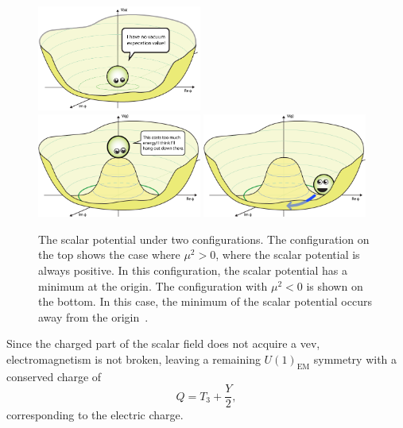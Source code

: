 \begin{figure}[ht]
  \centering
  \includegraphics[width=0.48\textwidth]
      {figs/theory/BoringPotential.png}
  \\
  \includegraphics[width=0.48\textwidth]
  {figs/theory/Higgs-Potential-lookdown.png}
  \includegraphics[width=0.48\textwidth]
  {figs/theory/Higgs-Potential-Goldstone.png}
  \caption[
    The scalar potential under two configurations:
    $\mu^2 > 0$ and $\mu^2 < 0$~\cite{QuantumDiariesHiggs}.
  ]{
    The scalar potential under two configurations.
    The configuration on the top shows the case where $\mu^2 > 0$, where
    the scalar potential is always positive.
    In this configuration, the scalar potential has a minimum at the origin.
    The configuration with $\mu^2 < 0$ is shown on the bottom.
    In this case, the minimum of the scalar potential occurs away from the
    origin~\cite{QuantumDiariesHiggs}.
  }
  \label{fig:symmetry_breaking}
\end{figure}

Since the charged part of the scalar field does not acquire a vev,
electromagnetism is not broken, leaving a remaining $U(1)_\mathrm{EM}$
symmetry with a conserved charge of
\begin{equation}
  Q = T_3 + \frac{Y}{2},
\end{equation}
corresponding to the electric charge.

